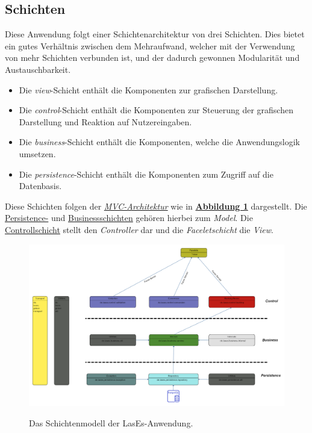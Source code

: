 
\subsection{Schichten}\label{arch:schichten}
Diese Anwendung folgt einer Schichtenarchitektur von drei Schichten. Dies bietet ein gutes Verhältnis zwischen dem Mehraufwand,
welcher mit der Verwendung von mehr Schichten verbunden ist, und der dadurch gewonnen Modularität und Austauschbarkeit.
\begin{itemize}
    \item Die \emph{view}-Schicht enthält die Komponenten zur grafischen Darstellung.
    \item Die \emph{control}-Schicht enthält die Komponenten zur Steuerung der grafischen Darstellung und Reaktion auf
    Nutzereingaben.
    \item Die \emph{business}-Schicht enthält die Komponenten, welche die Anwendungslogik umsetzen.
    \item Die \emph{persistence}-Schicht enthält die Komponenten zum Zugriff auf die Datenbasis.
\end{itemize}
Diese Schichten folgen der \emph{\hyperref[arch:mvc]{MVC-Architektur}} wie in \textbf{\hyperref[arch:pakdia]{Abbildung 1}} dargestellt.
Die \hyperref[arch:persistence]{Persistence-} und \hyperref[arch:business]{Businessschichten} gehören hierbei
zum \emph{Model}. Die \hyperref[arch:control]{Controllschicht} stellt den \emph{Controller} dar und die
\emph{Faceletschicht} %
die \emph{View}.

\begin{figure}[H]
\centering
    \includegraphics[width=0.8\linewidth]{graphics/Paketdiagramm5.0}\label{arch:pakdia}
    \caption{Das Schichtenmodell der LasEs-Anwendung.}
\end{figure}

